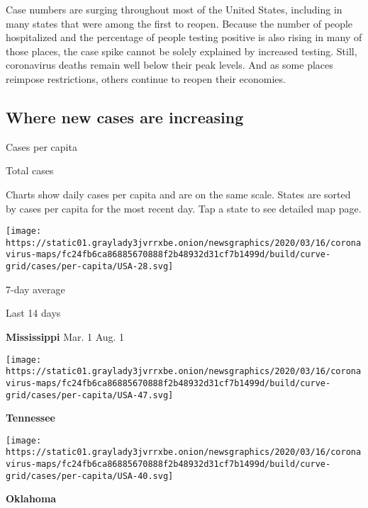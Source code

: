 Case numbers are surging throughout most of the United States, including
in many states that were among the first to reopen. Because the number
of people hospitalized and the percentage of people testing positive is
also rising in many of those places, the case spike cannot be solely
explained by increased testing. Still, coronavirus deaths remain well
below their peak levels. And as some places reimpose restrictions,
others continue to reopen their economies.

\hypertarget{where-new-cases-are-increasing}{%
\subsection{Where new cases are
increasing}\label{where-new-cases-are-increasing}}

Cases per capita

Total cases

Charts show daily cases per capita and are on the same scale. States are
sorted by cases per capita for the most recent day. Tap a state to see
detailed map page.

\href{https://www.nytimes3xbfgragh.onion/interactive/2020/us/mississippi-coronavirus-cases.html}{}

\texttt{[image: https://static01.graylady3jvrrxbe.onion/newsgraphics/2020/03/16/coronavirus-maps/fc24fb6ca86885670888f2b48932d31cf7b1499d/build/curve-grid/cases/per-capita/USA-28.svg]}

7-day average

Last 14 days

\textbf{Mississippi} Mar. 1 Aug. 1

\href{https://www.nytimes3xbfgragh.onion/interactive/2020/us/tennessee-coronavirus-cases.html}{}

\texttt{[image: https://static01.graylady3jvrrxbe.onion/newsgraphics/2020/03/16/coronavirus-maps/fc24fb6ca86885670888f2b48932d31cf7b1499d/build/curve-grid/cases/per-capita/USA-47.svg]}

\textbf{Tennessee}

\href{https://www.nytimes3xbfgragh.onion/interactive/2020/us/oklahoma-coronavirus-cases.html}{}

\texttt{[image: https://static01.graylady3jvrrxbe.onion/newsgraphics/2020/03/16/coronavirus-maps/fc24fb6ca86885670888f2b48932d31cf7b1499d/build/curve-grid/cases/per-capita/USA-40.svg]}

\textbf{Oklahoma}

\href{https://www.nytimes3xbfgragh.onion/interactive/2020/us/missouri-coronavirus-cases.html}{}

